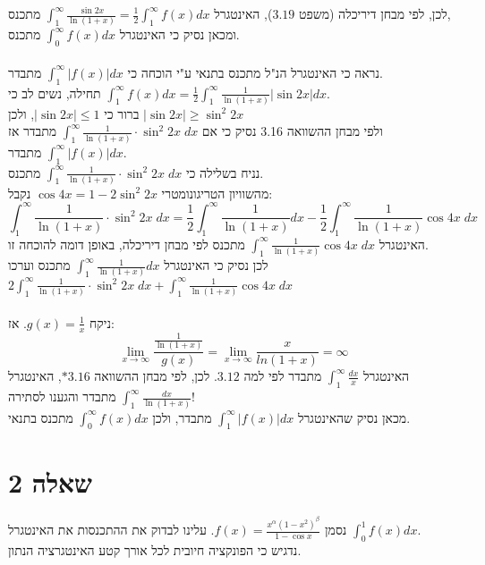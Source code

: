 \documentclass{article}
\begin{document}
לכן, לפי מבחן דיריכלה (משפט $3.19$),
האינטגרל $\int_1^\infty \frac{\sin 2x}{\ln(1+x)}=\frac{1}{2}\int_1^\infty f(x)dx$ מתכנס,\\
ומכאן נסיק כי האינטגרל $\int_0^\infty f(x)dx$ מתכנס.
\\\\
נראה כי האינטגרל הנ"ל מתכנס בתנאי ע"י הוכחה כי $\int_1^\infty |f(x)|dx$ מתבדר. \\
תחילה, נשים לב כי $\int_1^\infty f(x)dx=\frac{1}{2}\int_1^\infty \frac{1}{\ln(1+x)} |\sin 2x|dx$. \\
ברור כי $|\sin 2x|\leq 1$, ולכן $|\sin 2x| \geq \sin^2 2x$ \\
ולפי מבחן ההשוואה 3.16 נסיק כי אם $\int_1^\infty \frac{1}{\ln(1+x)} \cdot \sin^2 2x \; dx$ מתבדר
אז $\int_1^\infty |f(x)|dx$ מתבדר.\\
נניח בשלילה כי $\int_1^\infty \frac{1}{\ln(1+x)} \cdot \sin^2 2x \; dx$ מתכנס. \\
מהשוויון הטריגונומטרי $\cos 4x = 1-2\sin^2 2x$ נקבל:
\[
    \int_1^\infty \frac{1}{\ln(1+x)} \cdot \sin^2 2x \; dx =
    \frac{1}{2} \int_1^\infty \frac{1}{\ln(1+x)} dx - \frac{1}{2} \int_1^\infty \frac{1}{\ln(1+x)}\cos 4x \; dx
\]
האינטגרל $\int_1^\infty \frac{1}{\ln(1+x)}\cos 4x \; dx$
מתכנס לפי מבחן דיריכלה, באופן דומה להוכחה זו. \\
לכן נסיק כי האינטגרל $\int_1^\infty \frac{1}{\ln(1+x)}dx$
מתכנס וערכו $2\int_1^\infty \frac{1}{\ln(1+x)} \cdot \sin^2 2x \; dx + \int_1^\infty \frac{1}{\ln(1+x)}\cos 4x \; dx$
\\\\
ניקח $g(x)=\frac{1}{x}$. אז:
\[
    \lim_{x\rightarrow\infty}\frac{\frac{1}{\ln(1+x)}}{g(x)} =
    \lim_{x\rightarrow\infty}\frac{x}{ln(1+x)} = \infty
\]
האינטגרל $\int_1^\infty \frac{dx}{x}$ מתבדר לפי למה $3.12$.
לכן, לפי מבחן ההשוואה $*3.16$,
האינטגרל $\int_1^\infty \frac{dx}{\ln(1+x)}$ מתבדר
והגענו לסתירה! \\
מכאן נסיק שהאינטגרל $\int_1^\infty|f(x)|dx$ מתבדר,
ולכן $\int_0^\infty f(x)dx$ מתכנס בתנאי.

\pagebreak

\section*{שאלה 2}

נסמן $f(x)=\frac{x^\alpha(1-x^2)^\beta}{1-\cos x}$.
עלינו לבדוק את ההתכנסות את האינטגרל $\int_0^1f(x)dx$. \\
נדגיש כי הפונקציה חיובית לכל אורך קטע האינטגרציה הנתון.
\end{document}
